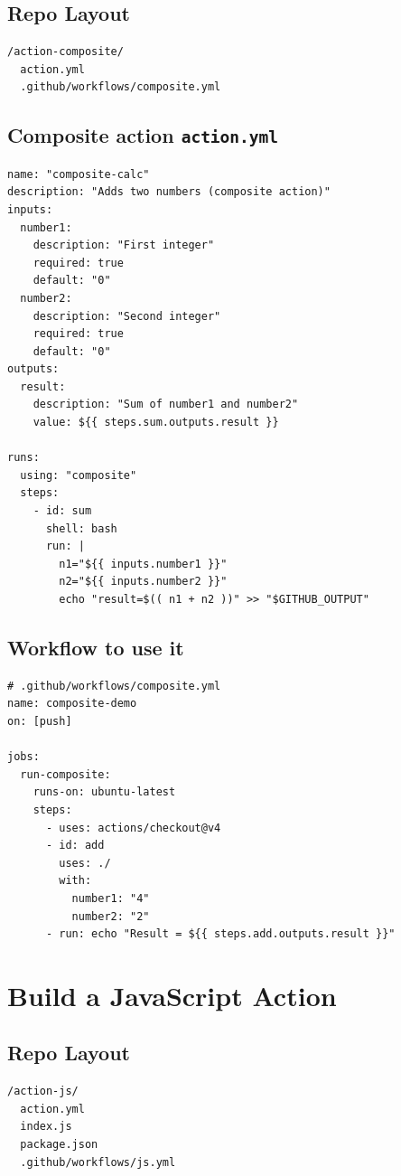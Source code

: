 \documentclass[11pt]{article}
\begin{document}
\subsection*{Repo Layout}
\begin{verbatim}
/action-composite/
  action.yml
  .github/workflows/composite.yml
\end{verbatim}

\subsection*{Composite action \texttt{action.yml}}
\begin{verbatim}
name: "composite-calc"
description: "Adds two numbers (composite action)"
inputs:
  number1:
    description: "First integer"
    required: true
    default: "0"
  number2:
    description: "Second integer"
    required: true
    default: "0"
outputs:
  result:
    description: "Sum of number1 and number2"
    value: ${{ steps.sum.outputs.result }}

runs:
  using: "composite"
  steps:
    - id: sum
      shell: bash
      run: |
        n1="${{ inputs.number1 }}"
        n2="${{ inputs.number2 }}"
        echo "result=$(( n1 + n2 ))" >> "$GITHUB_OUTPUT"
\end{verbatim}

\subsection*{Workflow to use it}
\begin{verbatim}
# .github/workflows/composite.yml
name: composite-demo
on: [push]

jobs:
  run-composite:
    runs-on: ubuntu-latest
    steps:
      - uses: actions/checkout@v4
      - id: add
        uses: ./
        with:
          number1: "4"
          number2: "2"
      - run: echo "Result = ${{ steps.add.outputs.result }}"
\end{verbatim}
\clearpage

\section{Build a JavaScript Action}
\subsection*{Repo Layout}
\begin{verbatim}
/action-js/
  action.yml
  index.js
  package.json
  .github/workflows/js.yml
\end{verbatim}
\end{document}
